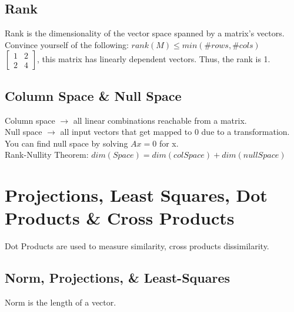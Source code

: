 \documentclass{article}
\begin{document}
\subsection{Rank}
Rank is the dimensionality of the vector space spanned by a matrix's vectors. Convince yourself of the following: $rank(M) \leq min(\# rows, \#cols)$ \\

$\begin{bmatrix}
    1 & 2 \\
    2 & 4 
\end{bmatrix}$, this matrix has linearly dependent vectors. Thus, the rank is 1. 

\subsection{Column Space \& Null Space}
Column space $\rightarrow$ all linear combinations reachable from a matrix.\\Null space $\rightarrow$ all input vectors that get mapped to 0 due to a transformation. \\ You can find null space by solving $Ax=0$ for x. \\Rank-Nullity Theorem: $dim(Space) = dim(colSpace) + dim(nullSpace)$

\section{Projections, Least Squares, Dot Products \& Cross Products}
Dot Products are used to measure similarity, cross products dissimilarity.

\subsection{Norm, Projections, \& Least-Squares}
Norm is the length of a vector. \\
\end{document}
